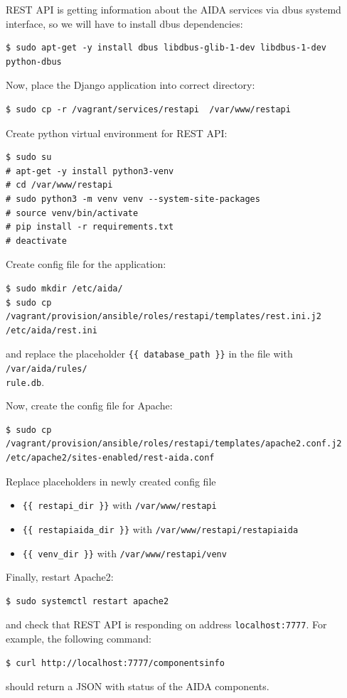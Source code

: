 \documentclass[a4paper]{article} %
\begin{document}
REST API is getting information about the AIDA services via dbus systemd interface, so we will have to install dbus dependencies:
\begin{lstlisting}
$ sudo apt-get -y install dbus libdbus-glib-1-dev libdbus-1-dev python-dbus
\end{lstlisting}

Now, place the Django application into correct directory:
\begin{lstlisting}
$ sudo cp -r /vagrant/services/restapi  /var/www/restapi
\end{lstlisting}

Create python virtual environment for REST API:
\begin{lstlisting}
$ sudo su
# apt-get -y install python3-venv
# cd /var/www/restapi
# sudo python3 -m venv venv --system-site-packages
# source venv/bin/activate
# pip install -r requirements.txt
# deactivate
\end{lstlisting}

Create config file for the application:
\begin{lstlisting}
$ sudo mkdir /etc/aida/
$ sudo cp /vagrant/provision/ansible/roles/restapi/templates/rest.ini.j2 /etc/aida/rest.ini
\end{lstlisting}
and replace the placeholder \texttt{\{\{ database\_path \}\}} in the file with \texttt{/var/aida/rules/\\rule.db}.

Now, create the config file for Apache:
\begin{lstlisting}
$ sudo cp /vagrant/provision/ansible/roles/restapi/templates/apache2.conf.j2 /etc/apache2/sites-enabled/rest-aida.conf
\end{lstlisting}
Replace placeholders in newly created config file
\begin{itemize}[noitemsep,nolistsep]
\item \texttt{\{\{ restapi\_dir \}\}} with \texttt{/var/www/restapi}
\item \texttt{\{\{ restapiaida\_dir \}\}} with \texttt{/var/www/restapi/restapiaida}
\item \texttt{\{\{ venv\_dir \}\}} with \texttt{/var/www/restapi/venv}
\end{itemize}

Finally, restart Apache2:
\begin{lstlisting}
$ sudo systemctl restart apache2
\end{lstlisting}
and check that REST API is responding on address \texttt{localhost:7777}. For example, the following command:
\begin{lstlisting}
$ curl http://localhost:7777/componentsinfo
\end{lstlisting}
should return a JSON with status of the AIDA components.
\end{document}
